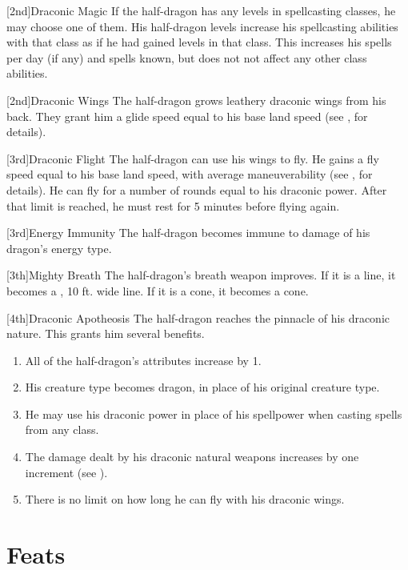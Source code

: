             [2nd]{Draconic Magic} If the half-dragon has any levels in spellcasting classes, he may choose one of them.
            His half-dragon levels increase his spellcasting abilities with that class as if he had gained levels in that class.
            This increases his spells per day (if any) and spells known, but does not not affect any other class abilities.

            [2nd]{Draconic Wings}
            The half-dragon grows leathery draconic wings from his back.
            They grant him a glide speed equal to his base land speed (see , for details).

            [3rd]{Draconic Flight}
            The half-dragon can use his wings to fly.
            He gains a fly speed equal to his base land speed, with average maneuverability (see , for details).
            He can fly for a number of rounds equal to his draconic power.
            After that limit is reached, he must rest for 5 minutes before flying again.

            [3rd]{Energy Immunity} The half-dragon becomes immune to damage of his dragon's energy type.

            [3th]{Mighty Breath}
            The half-dragon's breath weapon improves.
            If it is a line, it becomes a \areahuge, 10 ft. wide line.
            If it is a cone, it becomes a \arealarge cone.

            [4th]{Draconic Apotheosis}
            The half-dragon reaches the pinnacle of his draconic nature.
            This grants him several benefits.
            \begin{enumerate}
                \item All of the half-dragon's attributes increase by 1.
                \item His creature type becomes dragon, in place of his original creature type.
                \item He may use his draconic power in place of his spellpower when casting spells from any class.
                \item The damage dealt by his draconic natural weapons increases by one increment (see ).
                \item There is no limit on how long he can fly with his draconic wings.
            \end{enumerate}

\section{Feats}

